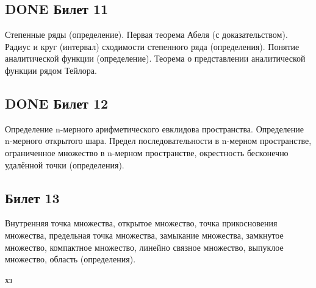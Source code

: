 \documentclass[11pt]{article}
\begin{document}
\subsection{{\bfseries\sffamily DONE} Билет 11}
\label{sec:org6838e4d}
Степенные ряды (определение). Первая теорема Абеля (с доказательством). Радиус и круг (интервал) сходимости степенного ряда (определения). Понятие аналитической функции (определение). Теорема о представлении аналитической функции рядом Тейлора.


\subsection{{\bfseries\sffamily DONE} Билет 12}
\label{sec:org8a65a3a}
Определение n-мерного арифметического евклидова пространства. Определение n-мерного открытого шара. Предел последовательности в n-мерном пространстве, ограниченное множество  в n-мерном пространстве, окрестность бесконечно удалённой точки (определения).


\subsection{Билет 13}
\label{sec:org0d8f236}
Внутренняя точка множества, открытое множество, точка прикосновения множества, предельная точка множества, замыкание множества, замкнутое множество, компактное множество, линейно связное множество, выпуклое множество, область (определения).

хз
\end{document}
